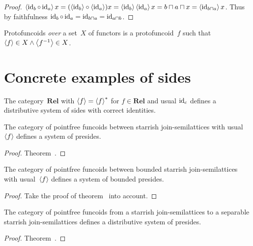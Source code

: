\begin{proof}
$\left\langle \operatorname{id}_b\circ\operatorname{id}_a\right\rangle x = (\left\langle \operatorname{id}_b\right\rangle\circ\left\langle \operatorname{id}_a\right\rangle)x = \left\langle \operatorname{id}_b\right\rangle\left\langle \operatorname{id}_a\right\rangle x = b\sqcap a\sqcap x = \left\langle \operatorname{id}_{b\sqcap a}\right\rangle x$.
Thus by faithfulness $\operatorname{id}_b\circ\operatorname{id}_a = \operatorname{id}_{b\sqcap a} = \operatorname{id}_{a\sqcap b}$.
\end{proof}

\begin{defn}
Protofuncoids \emph{over} a set~$X$ of functors is a protofuncoid~$f$
such that $\left\langle f\right\rangle\in X\land\left\langle f^{-1}\right\rangle\in X$.
\end{defn}

\section{Concrete examples of sides}

\begin{obvious}
The category~$\mathbf{Rel}$ with $\left\langle f\right\rangle=\left\langle f\right\rangle ^{\ast}$ for $f\in\mathbf{Rel}$ and usual $\operatorname{id}_c$ defines a distributive system of sides with correct identities.
\end{obvious}

\begin{prop}
The category of pointfree funcoids between starrish join-semilattices with usual~$\left\langle f\right\rangle$ defines a system of presides.
\end{prop}

\begin{proof}
Theorem~.
\end{proof}

\begin{prop}
The category of pointfree funcoids between bounded starrish join-semilattices with usual~$\left\langle f\right\rangle$ defines a system of
bounded presides.
\end{prop}

\begin{proof}
Take the proof of theorem~ into account.
\end{proof}

\begin{prop}
The category of pointfree funcoids from a starrish join-semilattices to a separable starrish join-semilattices
defines a distributive system of presides.
\end{prop}

\begin{proof}
Theorem~.
\end{proof}

